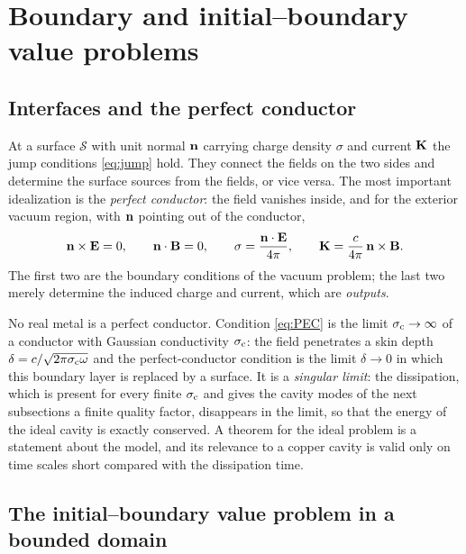 \section{Boundary and initial--boundary value problems}\label{sec:mx-bvp}

\subsection{Interfaces and the perfect conductor}

At a surface $\mathcal S$ with unit normal $\mathbf{n}$ carrying charge density
$\sigma$ and current $\mathbf{K}$ the jump conditions \eqref{eq:jump}
hold.  They connect the fields on the two sides and determine the surface
sources from the fields, or vice versa.  The most important idealization
is the \emph{perfect conductor}: the field vanishes inside, and for the
exterior vacuum region, with $\mathbf{n}$ pointing out of the conductor,
\begin{equation}\label{eq:PEC}
\mathbf{n}\times\mathbf{E}=0,\qquad \mathbf{n}\cdot\mathbf{B}=0,\qquad
\sigma=\frac{\mathbf{n}\cdot\mathbf{E}}{4\pi},\qquad \mathbf{K}=\frac c{4\pi}\,\mathbf{n}\times\mathbf{B} .
\end{equation}
The first two are the boundary conditions of the vacuum problem; the last
two merely determine the induced charge and current, which are
\emph{outputs}.

\begin{remark}
No real metal is a perfect conductor.  Condition \eqref{eq:PEC} is the
limit $\sigma_{\rm c}\to\infty$ of a conductor with Gaussian conductivity $\sigma_{\rm c}$: the field
penetrates a skin depth $\delta=c/\sqrt{2\pi\sigma_{\rm c}\omega}$ and the
perfect-conductor condition is the limit $\delta\to0$ in which this
boundary layer is replaced by a surface.  It is a \emph{singular limit}:
the dissipation, which is present for every finite $\sigma_{\rm c}$ and gives the
cavity modes of the next subsections a finite quality factor, disappears in the limit, so
that the energy of the ideal cavity is exactly conserved.  A theorem for the ideal problem
is a statement about the model, and its relevance to a copper
cavity is valid only on time scales short compared with the
dissipation time.
\end{remark}

\subsection{The initial--boundary value problem in a bounded domain}

